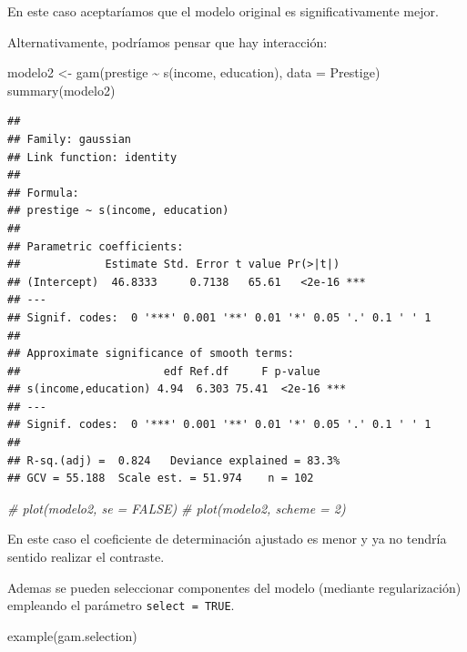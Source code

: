 \documentclass[
]{book}
\newenvironment{Shaded}{\begin{snugshade}}{\end{snugshade}}
\newcommand{\AttributeTok}[1]{\textcolor[rgb]{0.77,0.63,0.00}{#1}}
\newcommand{\CommentTok}[1]{\textcolor[rgb]{0.56,0.35,0.01}{\textit{#1}}}
\newcommand{\FunctionTok}[1]{\textcolor[rgb]{0.00,0.00,0.00}{#1}}
\newcommand{\NormalTok}[1]{#1}
\newcommand{\OtherTok}[1]{\textcolor[rgb]{0.56,0.35,0.01}{#1}}
\newcommand{\SpecialCharTok}[1]{\textcolor[rgb]{0.00,0.00,0.00}{#1}}
\theoremstyle{break}
\theoremstyle{definition}
\theoremstyle{definition}
\theoremstyle{definition}
\theoremstyle{definition}
\theoremstyle{remark}
\begin{document}
En este caso aceptaríamos que el modelo original es significativamente mejor.

Alternativamente, podríamos pensar que hay interacción:

\begin{Shaded}
\begin{Highlighting}[]
\NormalTok{modelo2 }\OtherTok{\textless{}{-}} \FunctionTok{gam}\NormalTok{(prestige }\SpecialCharTok{\textasciitilde{}} \FunctionTok{s}\NormalTok{(income, education), }\AttributeTok{data =}\NormalTok{ Prestige)}
\FunctionTok{summary}\NormalTok{(modelo2)}
\end{Highlighting}
\end{Shaded}

\begin{verbatim}
## 
## Family: gaussian 
## Link function: identity 
## 
## Formula:
## prestige ~ s(income, education)
## 
## Parametric coefficients:
##             Estimate Std. Error t value Pr(>|t|)    
## (Intercept)  46.8333     0.7138   65.61   <2e-16 ***
## ---
## Signif. codes:  0 '***' 0.001 '**' 0.01 '*' 0.05 '.' 0.1 ' ' 1
## 
## Approximate significance of smooth terms:
##                      edf Ref.df     F p-value    
## s(income,education) 4.94  6.303 75.41  <2e-16 ***
## ---
## Signif. codes:  0 '***' 0.001 '**' 0.01 '*' 0.05 '.' 0.1 ' ' 1
## 
## R-sq.(adj) =  0.824   Deviance explained = 83.3%
## GCV = 55.188  Scale est. = 51.974    n = 102
\end{verbatim}

\begin{Shaded}
\begin{Highlighting}[]
\CommentTok{\# plot(modelo2, se = FALSE)}
\CommentTok{\# plot(modelo2, scheme = 2)}
\end{Highlighting}
\end{Shaded}

En este caso el coeficiente de determinación ajustado es menor y ya no tendría sentido realizar el contraste.

Ademas se pueden seleccionar componentes del modelo (mediante regularización) empleando el parámetro \texttt{select\ =\ TRUE}.

\begin{Shaded}
\begin{Highlighting}[]
\FunctionTok{example}\NormalTok{(gam.selection)}
\end{Highlighting}
\end{Shaded}
\end{document}
